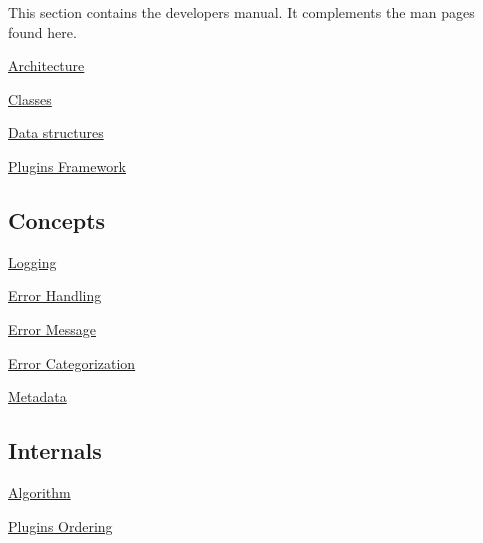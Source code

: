 This section contains the developer\textquotesingle{}s manual. It complements the man pages found here.


\begin{DoxyItemize}
\item \hyperlink{doc_dev_architecture_md}{Architecture}
\item \hyperlink{doc_dev_classes_md}{Classes}
\item \hyperlink{doc_dev_data-structures_md}{Data structures}
\item \hyperlink{doc_dev_plugins-framework_md}{Plugins Framework}
\end{DoxyItemize}

\subsection*{Concepts}


\begin{DoxyItemize}
\item \hyperlink{doc_dev_logging_md}{Logging}
\item \hyperlink{doc_dev_error-handling_md}{Error Handling}
\item \hyperlink{doc_dev_error-message_md}{Error Message}
\item \hyperlink{doc_dev_error-categorization_md}{Error Categorization}
\item \hyperlink{doc_dev_metadata_md}{Metadata}
\end{DoxyItemize}

\subsection*{Internals}


\begin{DoxyItemize}
\item \hyperlink{doc_dev_algorithm_md}{Algorithm}
\item \hyperlink{doc_dev_plugins-ordering_md}{Plugins Ordering} 
\end{DoxyItemize}